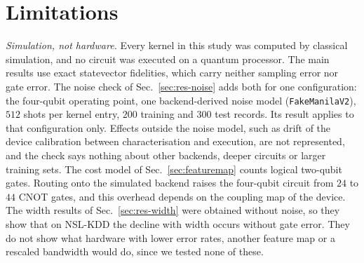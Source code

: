 \section{Limitations}\label{sec:limits}

\emph{Simulation, not hardware.} Every kernel in this study was computed by classical
simulation, and no circuit was executed on a quantum processor. The main results use exact
statevector fidelities, which carry neither sampling error nor gate error. The noise check of
Sec.~\ref{sec:res-noise} adds both for one configuration: the four-qubit operating point, one
backend-derived noise model (\texttt{FakeManilaV2}), $512$ shots per kernel entry, $200$
training and $300$ test records. Its result applies to that configuration only. Effects outside
the noise model, such as drift of the device calibration between characterisation and
execution, are not represented, and the check says nothing about other backends, deeper
circuits or larger training sets. The cost model of Sec.~\ref{sec:featuremap} counts logical
two-qubit gates. Routing onto the simulated backend raises the four-qubit circuit from $24$ to
$44$ CNOT gates, and this overhead depends on the coupling map of the device. The width
results of Sec.~\ref{sec:res-width} were obtained without noise, so they show that on NSL-KDD the decline with width occurs without gate error. They do not show
what hardware with lower error rates, another feature map or a rescaled bandwidth would do,
since we tested none of these.

